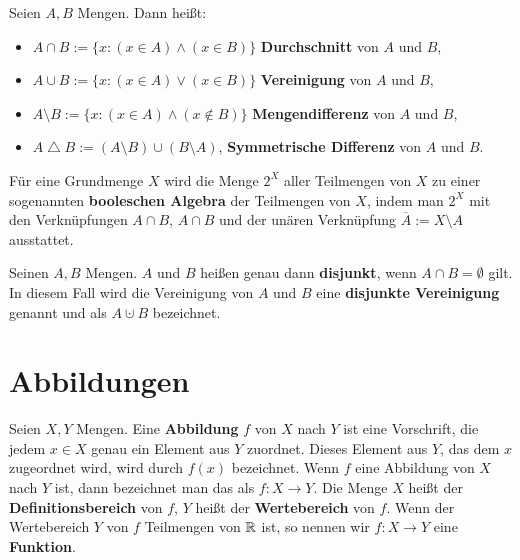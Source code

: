 \begin{defn}
Seien $ A,B $ Mengen. Dann heißt:
\begin{itemize}
\item $ A \cap B := \{ x : (x \in A) \wedge (x \in B) \} $ \textbf{Durchschnitt} von $ A $ und $ B $,
\item $ A \cup B := \{ x : (x \in A) \vee (x \in B) \} $ \textbf{Vereinigung} von $ A $ und $ B $,
\item $ A \setminus B := \{ x : (x \in A) \wedge (x \notin B) \} $ \textbf{Mengendifferenz} von $ A $ und $ B $,
\item $A \operatorname{\triangle} B := (A \setminus B) \cup (B \setminus A)$, \textbf{Symmetrische Differenz} von $A$ und $B$. 
\end{itemize}
\end{defn}

\begin{bem}
	Für eine Grundmenge $X$ wird die Menge $2^X$ aller Teilmengen von $X$ zu einer sogenannten \textbf{booleschen Algebra} der Teilmengen von $X$, indem man $2^X$ mit den Verknüpfungen $A \cap B$, $A \cap B$ und der unären Verknüpfung $\overline{A} := X \setminus A$ ausstattet. 
\end{bem} 

\begin{defn}
Seinen $ A,B $ Mengen. $ A $ und $ B $ heißen genau dann \textbf{disjunkt}, wenn $ A \cap B = \emptyset $ gilt. In diesem Fall wird die Vereinigung von $A$ und $B$ eine  \textbf{disjunkte Vereinigung} genannt
und als $A \cupdot B$ bezeichnet. 
\end{defn}

\section{Abbildungen}


\begin{defn}
Seien $ X,Y $ Mengen. Eine \textbf{Abbildung} $ f $ von $ X $ nach $ Y $ ist eine Vorschrift, die jedem $ x \in X $ genau ein Element aus $ Y $ zuordnet. Dieses Element aus $ Y $, das dem $x$ zugeordnet wird, wird durch $ f(x) $ bezeichnet. Wenn $ f $ eine Abbildung von $ X $ nach $ Y $ ist, dann bezeichnet man das als $ f : X \to Y $. Die Menge $ X $ heißt der \textbf{Definitionsbereich} von $ f $, $ Y $ heißt der \textbf{Wertebereich} von $ f $. Wenn der Wertebereich $Y$ von $f$ Teilmengen von $\mathbb{R}$ ist, so nennen wir $f : X \to Y$ eine \textbf{Funktion}. 
\end{defn} 

